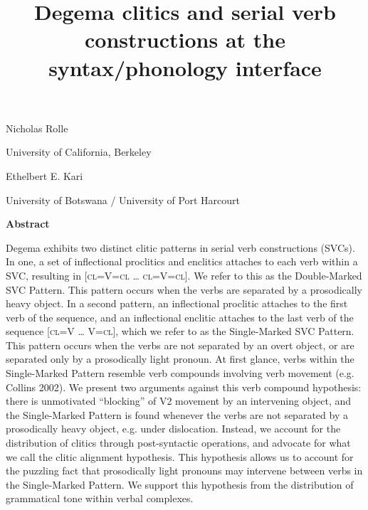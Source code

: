 
\title{Degema clitics and serial verb constructions at the syntax/phonology interface}

\begin{styleNoSpacing}
Nicholas Rolle
\end{styleNoSpacing}

\begin{styleNoSpacing}
University of California, Berkeley
\end{styleNoSpacing}

\begin{styleNoSpacing}
Ethelbert E. Kari
\end{styleNoSpacing}

\begin{styleNoSpacing}
University of Botswana / University of Port Harcourt
\end{styleNoSpacing}

\begin{styleNoSpacing}\bfseries
Abstract
\end{styleNoSpacing}

\begin{stylelsAbstract}
Degema exhibits two distinct clitic patterns in serial verb constructions (SVCs). In one, a set of inflectional proclitics and enclitics attaches to each verb within a SVC, resulting in [\textsc{cl=}V\textsc{=cl} … \textsc{cl=}V\textsc{=cl}]. We refer to this as the Double-Marked SVC Pattern. This pattern occurs when the verbs are separated by a prosodically heavy object. In a second pattern, an inflectional proclitic attaches to the first verb of the sequence, and an inflectional enclitic attaches to the last verb of the sequence [\textsc{cl=}V … V\textsc{=cl}], which we refer to as the Single-Marked SVC Pattern. This pattern occurs when the verbs are not separated by an overt object, or are separated only by a prosodically light pronoun. At first glance, verbs within the Single-Marked Pattern resemble verb compounds involving verb movement (e.g. Collins 2002). We present two arguments against this verb compound hypothesis: there is unmotivated “blocking” of V2 movement by an intervening object, and the Single-Marked Pattern is found whenever the verbs are not separated by a prosodically heavy object, e.g. under dislocation. Instead, we account for the distribution of clitics through post-syntactic operations, and advocate for what we call the clitic alignment hypothesis. This hypothesis allows us to account for the puzzling fact that prosodically light pronouns may intervene between verbs in the Single-Marked Pattern. We support this hypothesis from the distribution of grammatical tone within verbal complexes.
\end{stylelsAbstract}


